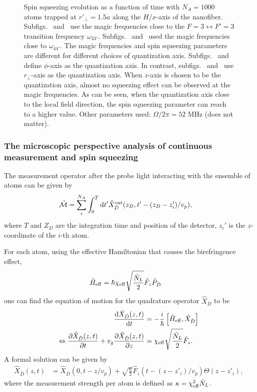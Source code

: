 \begin{figure}
\caption{Spin squeezing evolution as a function of time with $ N_A=1000 $ atoms trapped at $ r'\!_\perp =1.5a $ along the $ H/x $-axis of the nanofiber. Subfigs.~\protect{} and~\protect{} use the magic frequencies close to the $ F=3\leftrightarrow F'=3 $ transition frequency $ \omega_{33'} $. Subfigs.~\protect{} and~\protect{} used the magic frequencies close to $ \omega_{44'} $. The magic frequencies and spin squeezing parameters are different for different choices of quantization axis. Subfigs.~\protect{} and~\protect{} define $ \phi $-axis as the quantization axis. In contrast, subfigs.~\protect{} and~\protect{} use $ r\!_\perp $-axis as the quantization axis. When $ z $-axis is chosen to be the quantization axis, almost no squeezing effect can be observed at the magic frequencies. As can be seen, when the quantization axis close to the local field direction, the spin squeezing parameter can reach to a higher value. Other parameters used: $ \Omega/2\pi=52 $ MHz (does not matter). }\label{fig:xi_magic}
\end{figure}



\newpage

\subsubsection{The microscopic perspective analysis of continuous measurement and spin squeezing}

The measurement operator after the probe light interacting with the ensemble of atoms can be given by
\begin{align}
\hat{\mathcal{M}} &= \sum_i^{N_A} \int_0^T \mathrm{d}t' \hat{X}_{\bar{D}}^{\rm out} (z_D,t'-(z_{D}-z_i')/v_p),\label{eq:Mxout}
\end{align}
where $ T $ and $ Z_D $ are the integration time and position of the detector, $ z_i' $ is the $ z $-coordinate of the $ i $-th atom. 
 

For each atom, using the effective Hamiltonian that causes the birefringence effect, 
\begin{align}
\hat{H}_{\rm eff} &= \hbar \chi_{\rm eff} \sqrt{\frac{\dot{N}_L}{2}} \hat{F}_z \hat{P}_{\bar{D}}
\end{align}
one can find the equation of motion for the quadrature operator $ \hat{X}_{\bar{D}} $ to be
\begin{align}
\frac{{\mathrm d} {\hat{X}_{\bar{D}}(z,t)}}{{\mathrm d}t} &= -\frac{i}{\hbar} \left[ \hat{H}_{\rm eff},\hat{X}_{\bar{D}} \right] \\
\Leftrightarrow \frac{\partial {\hat{X}_{\bar{D}}(z,t)}}{\partial {t}}+v_g\frac{\partial {\hat{X}_{\bar{D}}(z,t)}}{\partial {z}} &=  \chi_{\rm eff} \sqrt{\frac{\dot{N}_L}{2}} \hat{F}_z.
\end{align}
A formal solution can be given by
\begin{align}
\hat{X}_{\bar{D}} (z,t) &= \hat{X}_{\bar{D}}(0,t-z/v_p) + \sqrt{\frac{\kappa}{2}}\hat{F}_z(t-(z-z'_i)/v_p)\Theta(z-z'_i),
\end{align} 
where the measurement strength per atom is defined as $ \kappa = \chi_{\rm eff}^2 \dot{N}_L $. 

